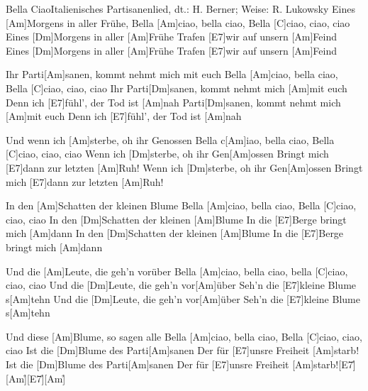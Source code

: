 \documentclass[../main.tex]{subfiles}
\begin{document}
\begin{song}[5]{Bella Ciao}{Italienisches Partisanenlied, dt.: H. Berner; Weise: R. Lukowsky}{}       
Eines [Am]Morgens in aller Frühe,
Bella [Am]ciao, bella ciao, Bella [C]ciao, ciao, ciao
Eines [Dm]Morgens in aller [Am]Frühe
Trafen [E7]wir auf unsern [Am]Feind
Eines [Dm]Morgens in aller [Am]Frühe
Trafen [E7]wir auf unsern [Am]Feind

Ihr Parti[Am]sanen, kommt nehmt mich mit euch
Bella [Am]ciao, bella ciao, Bella [C]ciao, ciao, ciao
Ihr Parti[Dm]sanen, kommt nehmt mich [Am]mit euch
Denn ich [E7]fühl', der Tod ist [Am]nah
Parti[Dm]sanen, kommt nehmt mich [Am]mit euch
Denn ich [E7]fühl', der Tod ist [Am]nah

Und wenn ich [Am]sterbe, oh ihr Genossen
Bella c[Am]iao, bella ciao, Bella [C]ciao, ciao, ciao
Wenn ich [Dm]sterbe, oh ihr Gen[Am]ossen
Bringt mich [E7]dann zur letzten [Am]Ruh!
Wenn ich [Dm]sterbe, oh ihr Gen[Am]ossen
Bringt mich [E7]dann zur letzten [Am]Ruh!

In den [Am]Schatten der kleinen Blume
Bella [Am]ciao, bella ciao, Bella [C]ciao, ciao, ciao
In den [Dm]Schatten der kleinen [Am]Blume
In die [E7]Berge bringt mich [Am]dann
In den [Dm]Schatten der kleinen [Am]Blume
In die [E7]Berge bringt mich [Am]dann

Und die [Am]Leute, die geh'n vorüber
Bella [Am]ciao, bella ciao, bella [C]ciao, ciao, ciao
Und die [Dm]Leute, die geh'n vor[Am]{ü}ber
Seh'n die [E7]kleine Blume s[Am]tehn
Und die [Dm]Leute, die geh'n vor[Am]{ü}ber
Seh'n die [E7]kleine Blume s[Am]tehn

Und diese [Am]Blume, so sagen alle
Bella [Am]ciao, bella ciao, Bella [C]ciao, ciao, ciao
Ist die [Dm]Blume des Parti[Am]sanen
Der für [E7]unsre Freiheit [Am]starb!
Ist die [Dm]Blume des Parti[Am]sanen
Der für [E7]unsre Freiheit [Am]starb![E7]{\h}[Am]{\h}[E7]{\h}[Am]{\h}
\end{song}
\end{document}
